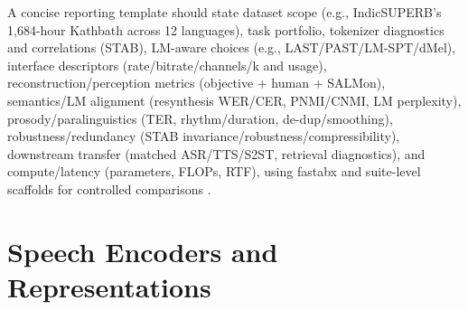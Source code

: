 \documentclass{article}
\begin{document}
A concise reporting template should state dataset scope (e.g., IndicSUPERB's 1,684-hour Kathbath across 12 languages), task portfolio, tokenizer diagnostics and correlations (STAB), LM-aware choices (e.g., LAST/PAST/LM-SPT/dMel), interface descriptors (rate/bitrate/channels/k and usage), reconstruction/perception metrics (objective + human + SALMon), semantics/LM alignment (resynthesis WER/CER, PNMI/CNMI, LM perplexity), prosody/paralinguistics (TER, rhythm/duration, de-dup/smoothing), robustness/redundancy (STAB invariance/robustness/compressibility), downstream transfer (matched ASR/TTS/S2ST, retrieval diagnostics), and compute/latency (parameters, FLOPs, RTF), using fastabx and suite-level scaffolds for controlled comparisons \cite{vashishth2024stabspeechtokenizerassessmentbenchmark,turetzky2024lastlanguagemodelawarespeechtokenization,har-tuv2025pastphoneticacousticspeechtokenizer,bai2025dmelspeechtokenizationmadesimple,jo2025lmsptalignedsemanticdistillationspeechto,poli2025fastabxlibraryefficientcomputationabxdis,entry2025indicsuperbspeechprocessinguniversalperf}.

















\section{Speech Encoders and Representations} \label{sec:speechencodersandrepresentations}
\end{document}

